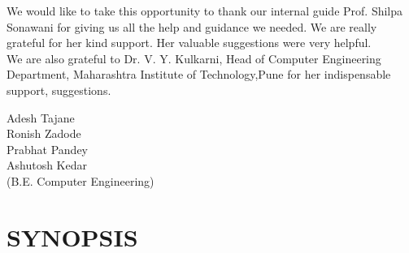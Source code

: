 \documentclass[12pt,a4paper]{report}
\begin{document}
We would like to take this opportunity to thank our internal guide Prof. Shilpa Sonawani
for giving us all the help and guidance we needed. We are really grateful for
her kind support. Her valuable suggestions were very helpful.\\

We are also grateful to Dr. V. Y. Kulkarni, Head of Computer Engineering Department, Maharashtra Institute of Technology,Pune for her indispensable support, suggestions.\\




\begin{flushleft}
\hspace{3.7in}Adesh Tajane\\
\hspace{3.7in}Ronish Zadode\\
\hspace{3.7in}Prabhat Pandey\\
\hspace{3.7in}Ashutosh Kedar\\
\hspace{3.7in}(B.E. Computer Engineering)\\
\end{flushleft}



\newpage

\tableofcontents

\newpage
{\setlength{\baselineskip}{1.5\baselineskip}
\listoffigures
}
\newpage
{\setlength{\baselineskip}{1.5\baselineskip}
\listoftables
}




\chapter{\bf{SYNOPSIS}}
\pagestyle{fancy}
\renewcommand{\footrulewidth}{0.3pt}
\end{document}
